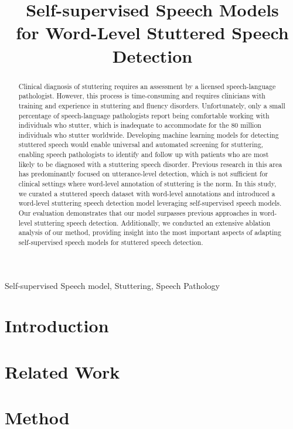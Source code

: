 \documentclass{article}
\title{Self-supervised Speech Models 
 \\ for Word-Level Stuttered Speech Detection}
\begin{document}
%
\maketitle
%
\begin{abstract}
Clinical diagnosis of stuttering requires an assessment by a licensed speech-language pathologist. However, this process is time-consuming and requires clinicians with training and experience in stuttering and fluency disorders. Unfortunately, only a small percentage of speech-language pathologists report being comfortable working with individuals who stutter, which is inadequate to accommodate for the 80 million individuals who stutter worldwide. Developing machine learning models for detecting stuttered speech would enable universal and automated screening for stuttering, enabling speech pathologists to identify and follow up with patients who are most likely to be diagnosed with a stuttering speech disorder.
Previous research in this area has predominantly focused on utterance-level detection, which is not sufficient for clinical settings where word-level annotation of stuttering is the norm. 
In this study, we curated a stuttered speech dataset with word-level annotations and introduced a word-level stuttering speech detection model leveraging self-supervised speech models.
Our evaluation demonstrates that our model surpasses previous approaches in word-level stuttering speech detection. 
Additionally, we conducted an extensive ablation analysis of our method, providing insight into the most important aspects of adapting self-supervised speech models for stuttered speech detection.
\end{abstract}
%
\begin{keywords}
Self-supervised Speech model, Stuttering, Speech Pathology
\end{keywords}

%
\section{Introduction}
\label{sec:intro}



\section{Related Work}
\label{sec:related_work}


\section{Method}
\label{sec:method}

\end{document}
